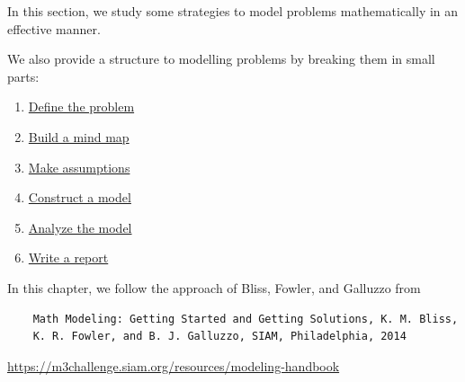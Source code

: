 
%
%


\begin{topic}

\label{chap1}
In this section, we study some strategies to model problems mathematically in an effective manner.

We also provide a structure to modelling problems by breaking them in small parts:

\begin{enumerate}[label={\bf \arabic*.}]
	\item \hyperref[moddefine]{Define the problem}
	\item \hyperref[mindmap]{Build a mind map}
	\item \hyperref[assumption]{Make assumptions}
	\item \hyperref[model]{Construct a model}
	\item \hyperref[analysis]{Analyze the model}
	\item \hyperref[report]{Write a report}
\end{enumerate}

\vspace{2cm}

In this chapter, we follow the approach of Bliss, Fowler, and Galluzzo from
\begin{graybox}
\begin{minipage}{.75\textwidth}
\begin{verbatim}
	Math Modeling: Getting Started and Getting Solutions, K. M. Bliss, 
	K. R. Fowler, and B. J. Galluzzo, SIAM, Philadelphia, 2014
\end{verbatim}
\begin{center}
\url{https://m3challenge.siam.org/resources/modeling-handbook}
\end{center}
\end{minipage}
\hfill
\begin{minipage}{.20\textwidth}
	\hfill{}	
\end{minipage}
\end{graybox}


\vfill



\end{topic}
